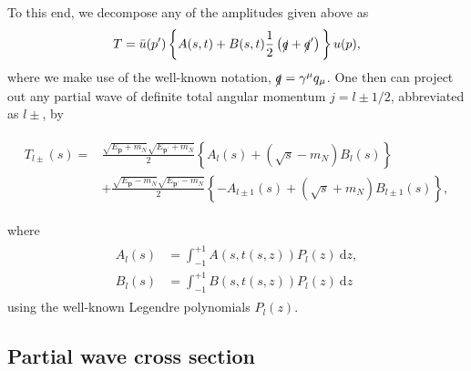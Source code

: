 \documentclass[reprint,amssymb,amsmath,floatfix,aps,prd,groupedaddress,nofootinbib]{revtex4-2}
\begin{document}
To this end, we decompose any of the amplitudes given above as
\begin{equation}\label{eq:tdecomp}
T = \bar{u}(p^\prime) \left\{A(s,t) + B(s,t)\frac{1}{2}\left(\slashed{q} + \slashed{q}^\prime\right)\, \right\} u(p) ,
\end{equation}
where we make use of the well-known notation, $\slashed{q} = \gamma^\mu q_\mu$. One then can project out
any partial wave of definite total angular momentum $j=l\pm 1/2$, abbreviated as $l\pm$, by
\begin{widetext}
\begin{align}
\begin{split}
T_{l\pm} (s) = & \frac{\sqrt{E_\mathbf{p}+m_N}\sqrt{E_\mathbf{p^\prime}+m_N}}{2}\left\{A_l(s) + \left(\sqrt{s}-m_N\right) B_l(s) \right\} \\
 & + \frac{\sqrt{E_\mathbf{p}-m_N}\sqrt{E_\mathbf{p^\prime}-m_N}}{2}\left\{-A_{l\pm 1}(s) + \left(\sqrt{s}+m_N\right) B_{l\pm 1}(s) \right\},
\end{split}\label{eq:lprojection}
\end{align}
\end{widetext}
where
\begin{align}
\begin{split}
A_l (s) & = \int_{-1}^{+1} A(s,t(s,z)) P_l(z)\ \text{d}z,\\ B_l (s) & = \int_{-1}^{+1} B(s,t(s,z)) P_l(z)\ \text{d}z
\end{split}
\end{align}
using the well-known Legendre polynomials $P_l(z)$.

\subsection{Partial wave cross section}
\end{document}
